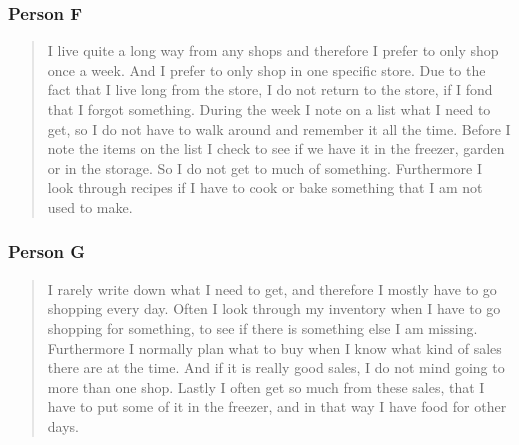 \subsubsection{Person F}
\begin{quote}
I live quite a long way from any shops and therefore I prefer to only shop once a week. And I prefer to only shop in one specific store. Due to the fact that I live long from the store, I do not return to the store, if I fond that I forgot something. During the week I note on a list what I need to get, so I do not have to walk around and remember it all the time. Before I note the items on the list I check to see if we have it in the freezer, garden or in the storage. So I do not get to much of something. Furthermore I look through recipes if I have to cook or bake something that I am not used to make.
\end{quote}

\subsubsection{Person G}
\begin{quote}
I rarely write down what I need to get, and therefore I mostly have to go shopping every day. Often I look through my inventory when I have to go shopping for something, to see if there is something else I am missing. Furthermore I normally plan what to buy when I know what kind of sales there are at the time. And if it is really good sales, I do not mind going to more than one shop. Lastly I often get so much from these sales, that I have to put some of it in the freezer, and in that way I have food for other days.
\end{quote}